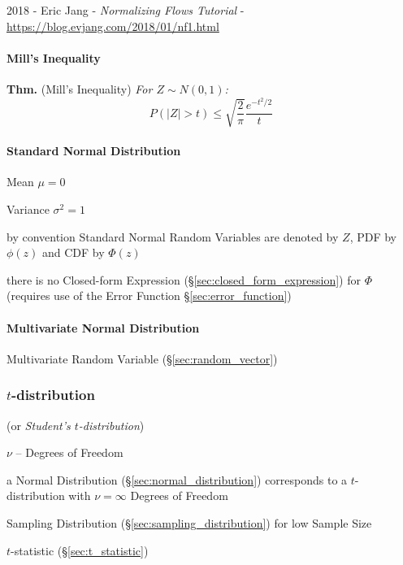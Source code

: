 2018 - Eric Jang
- \emph{Normalizing Flows Tutorial}
- \url{https://blog.evjang.com/2018/01/nf1.html}



\paragraph{Mill's Inequality}\label{sec:mills_inequality}\hfill

\textbf{Thm.} (Mill's Inequality) \emph{
  For $Z \sim N(0,1)$:
  \[
    P(|Z| > t) \leq \sqrt{\frac{2}{\pi}}\frac{e^{-t^2/2}}{t}
  \]
}



\paragraph{Standard Normal Distribution}\label{sec:standard_normal}\hfill

Mean $\mu = 0$

Variance $\sigma^2 = 1$

by convention Standard Normal Random Variables are denoted by $Z$, PDF by
$\phi(z)$ and CDF by $\Phi(z)$

there is no Closed-form Expression (\S\ref{sec:closed_form_expression}) for
$\Phi$ (requires use of the Error Function \S\ref{sec:error_function})



\paragraph{Multivariate Normal Distribution}\label{sec:multivariate_normal}
\hfill

Multivariate Random Variable (\S\ref{sec:random_vector})



\subsubsection{$t$-distribution}\label{sec:t_distribution}

(or \emph{Student's $t$-distribution})

$\nu$ -- Degrees of Freedom

a Normal Distribution (\S\ref{sec:normal_distribution}) corresponds to a
$t$-distribution with $\nu = \infty$ Degrees of Freedom

Sampling Distribution (\S\ref{sec:sampling_distribution}) for low Sample Size

$t$-statistic (\S\ref{sec:t_statistic})

